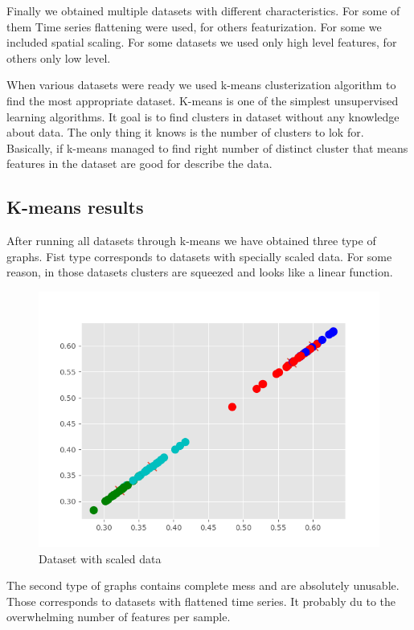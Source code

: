 \documentclass[conference,compsoc]{IEEEtran}
\begin{document}
Finally we obtained multiple datasets with different characteristics. For some of them Time series flattening were used, for others featurization. For some we included spatial scaling. For some datasets we used only high level features, for others only low level. 

When various datasets were ready we used k-means clusterization algorithm to find the most appropriate dataset. K-means is one of the simplest unsupervised learning algorithms. It goal is to find clusters in dataset without any knowledge about data. The only thing it knows is the number of clusters to lok for. Basically, if k-means managed to find right number of distinct cluster that means features in the dataset are good for describe the data.

\subsection{K-means results}
After running all datasets through k-means we have obtained three type of graphs. 
Fist type corresponds to datasets with specially scaled data. For some reason, in those datasets clusters are squeezed and looks like a linear function. 
\begin{figure}[h]
\caption{Dataset with scaled data}
\includegraphics[scale=0.40]{ds1}
\centering
\end{figure}

The second type of graphs contains complete mess and are absolutely unusable. Those corresponds to datasets with flattened time series. It probably du to the overwhelming number of features per sample.
\end{document}
